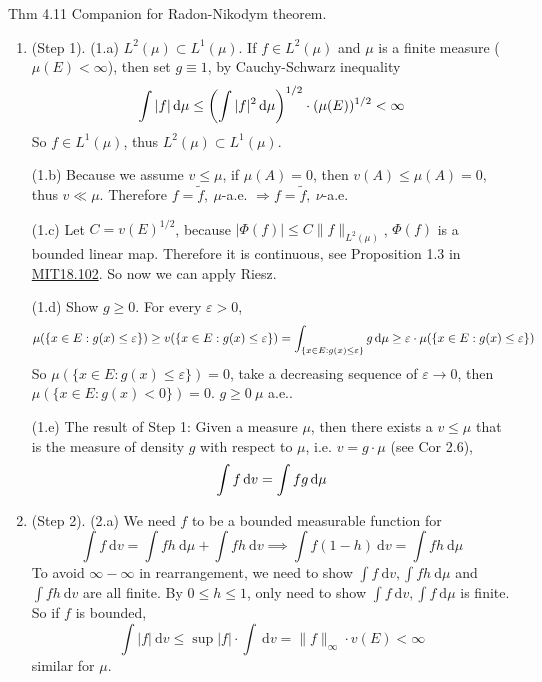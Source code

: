 \begin{note}{Thm 4.11}
Companion for Radon-Nikodym theorem.
\begin{enumerate}
    \item (Step 1). (1.a) $L^2(\mu)\subset L^1(\mu)$. If $f\in L^2(\mu)$ and $\mu$ is a finite measure ($\mu(E)<\infty$), then set $g\equiv 1$, by Cauchy-Schwarz inequality
    \[
    \int|f| \mathop{}\!\mathrm{d} \mu \leq\left(\int|f|^{2} \mathop{}\!\mathrm{d} \mu\right)^{1 / 2} \cdot(\mu(E))^{1 / 2}<\infty 
    \]
    So $f\in L^1(\mu)$, thus $L^2(\mu)\subset L^1(\mu)$.

    (1.b) Because we assume $v\le \mu$, if $\mu(A)=0$, then $v(A)\le \mu(A)=0$, thus $v\ll \mu$. Therefore \( f=\tilde{f},\ \mu \)-a.e. \( \Rightarrow f=\tilde{f},\ \nu \)-a.e.

    (1.c) Let $C=v(E)^{1/2}$, because $|\Phi(f)|\le C\|f\|_{L^2(\mu)}$, $\Phi(f)$ is a bounded linear map. Therefore it is continuous, see Proposition 1.3 in \href{https://ocw.mit.edu/courses/18-102-introduction-to-functional-analysis-spring-2021/3d4cc88026d44a01f936cd6a0aa995cb_MIT18_102s20_lec_FA.pdf}{MIT18.102}. So now we can apply Riesz.

    (1.d) Show $g\ge 0$. For every $\varepsilon>0$,
    \[
    \begin{aligned}
        \mu(\{x\in E:g(x)\le \varepsilon\})\ge v(\{x\in E:g(x)\le \varepsilon\})=\int_{\{x\in E:g(x)\le \varepsilon\}}g\mathop{}\!\mathrm{d} \mu\ge \varepsilon\cdot \mu(\{x\in E:g(x)\le \varepsilon\})
    \end{aligned}
    \]
    So $\mu(\{x\in E:g(x)\le \varepsilon\})=0$, take a decreasing sequence of $\varepsilon\to 0$, then $\mu(\{x\in E:g(x)<0\})=0$. $g\ge 0\ \mu$ a.e..

    (1.e) The result of Step 1: Given a measure $\mu$, then there exists a $v\le \mu$ that is the measure of density $g$ with respect to $\mu$, i.e. $v=g\cdot \mu$ (see Cor 2.6),
    \[
    \int f\mathop{}\!\mathrm{d} v=\int fg\mathop{}\!\mathrm{d} \mu
    \]
    \item (Step 2). (2.a) We need $f$ to be a bounded measurable function for
    \[
    \int f \mathrm{~d} v=\int f h \mathrm{~d} \mu+\int f h \mathrm{~d} v\implies
    \int f (1-h)\mathrm{~d} v=\int f h \mathrm{~d} \mu
    \]
    To avoid $\infty-\infty$ in rearrangement, we need to show $\int f \mathrm{~d} v,\int f h \mathrm{~d} \mu$ and $\int f h \mathrm{~d} v$ are all finite. By $0\le h\le 1$, only need to show $\int f \mathrm{~d} v,\int f \mathrm{~d} \mu$ is finite. So if $f$ is bounded,
    \[
    \int |f| \mathrm{~d} v\le \sup |f|\cdot\int \mathrm{~d} v=\|f\|_{\infty}\cdot v(E)<\infty
    \]
    similar for $\mu$.


\end{enumerate}
\end{note}
